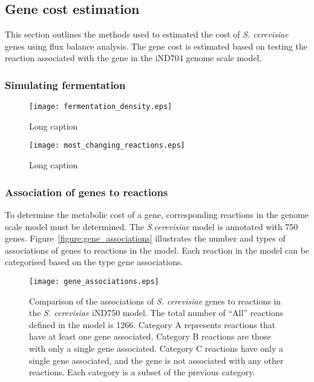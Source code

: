 \subsection{Gene cost estimation}

This section outlines the methods used to estimated the cost of \emph{S. cerevisiae} genes using flux balance analysis. The gene cost is estimated based on testing the reaction associated with the gene in the iND704 genome scale model.

\subsubsection{Simulating fermentation}

\begin{figure}
  \centering
  \texttt{[image: fermentation\_density.eps]}
  \caption[Short caption]{Long caption}
  \label{figure:fermentation_density}
\end{figure}

\begin{sidewaysfigure}
  \centering
  \texttt{[image: most\_changing\_reactions.eps]}
  \caption[Short caption]{Long caption}
  \label{figure:most_changing_reactions}
\end{sidewaysfigure}

\subsubsection{Association of genes to reactions}

To determine the metabolic cost of a gene, corresponding reactions in the genome scale model must be determined. The \emph{S.cerevisiae} model is annotated with 750 genes. Figure~\vref{figure:gene_associations} illustrates the number and types of associations of genes to reactions in the model. Each reaction in the model can be categorised based on the type gene associations.

\begin{figure}
\centering
\texttt{[image: gene\_associations.eps]}
\caption[Gene associations in the \emph{S. cerevisiae} iND750 model]{Comparison of the associations of \emph{S. cerevisiae} genes to reactions in the \emph{S. cerevisiae} iND750 model. The total number of ``All'' reactions defined in the model is 1266. Category A represents reactions that have at least one gene associated. Category B reactions are those with only a single gene associated. Category C reactions have only a single gene associated, and the gene is not associated with any other reactions. Each category is a subset of the previous category.}
\label{figure:gene_associations}
\end{figure}

